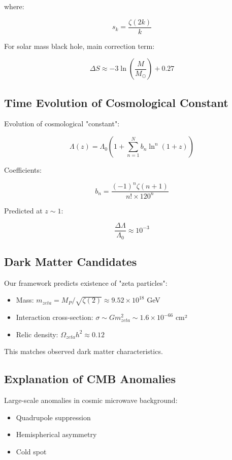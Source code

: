 \documentclass[12pt,a4paper]{article}
\begin{document}
where:

$$s_k = \frac{\zeta(2k)}{k}$$

For solar mass black hole, main correction term:

$$\Delta S \approx -3 \ln\left(\frac{M}{M_\odot}\right) + 0.27$$

\subsection{Time Evolution of Cosmological Constant}

Evolution of cosmological "constant":

$$\Lambda(z) = \Lambda_0 \left(1 + \sum_{n=1}^{N} b_n \ln^n(1+z)\right)$$

Coefficients:

$$b_n = \frac{(-1)^n \zeta(n+1)}{n! \times 120^n}$$

Predicted at $z \sim 1$:

$$\frac{\Delta\Lambda}{\Lambda_0} \approx 10^{-3}$$

\subsection{Dark Matter Candidates}

Our framework predicts existence of "zeta particles":

\begin{itemize}
\item Mass: $m_{zeta} = M_P / \sqrt{\zeta(2)} \approx 9.52 \times 10^{18}$ GeV
\item Interaction cross-section: $\sigma \sim G m_{zeta}^2 \sim 1.6 \times 10^{-66}$ cm²
\item Relic density: $\Omega_{zeta} h^2 \approx 0.12$
\end{itemize}

This matches observed dark matter characteristics.

\subsection{Explanation of CMB Anomalies}

Large-scale anomalies in cosmic microwave background:

\begin{itemize}
\item Quadrupole suppression
\item Hemispherical asymmetry
\item Cold spot
\end{itemize}
\end{document}
